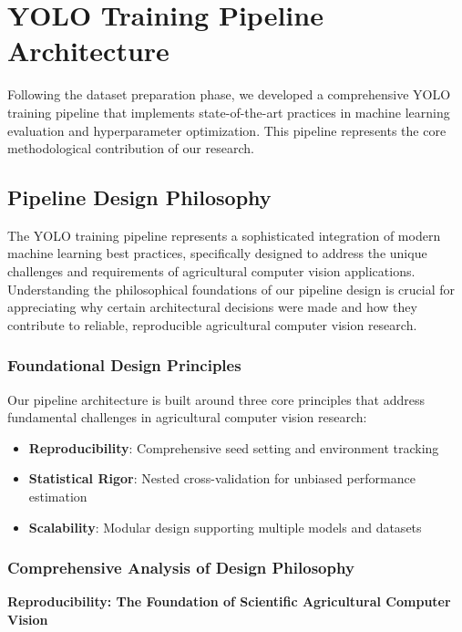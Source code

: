 \section{YOLO Training Pipeline Architecture}
Following the dataset preparation phase, we developed a comprehensive YOLO training pipeline that implements state-of-the-art practices in machine learning evaluation and hyperparameter optimization. This pipeline represents the core methodological contribution of our research.

\subsection{Pipeline Design Philosophy}

The YOLO training pipeline represents a sophisticated integration of modern machine learning best practices, specifically designed to address the unique challenges and requirements of agricultural computer vision applications. Understanding the philosophical foundations of our pipeline design is crucial for appreciating why certain architectural decisions were made and how they contribute to reliable, reproducible agricultural computer vision research.

\subsubsection{Foundational Design Principles}

Our pipeline architecture is built around three core principles that address fundamental challenges in agricultural computer vision research:

\begin{itemize}
    \item \textbf{Reproducibility}: Comprehensive seed setting and environment tracking
    \item \textbf{Statistical Rigor}: Nested cross-validation for unbiased performance estimation
    \item \textbf{Scalability}: Modular design supporting multiple models and datasets
\end{itemize}

\subsubsection{Comprehensive Analysis of Design Philosophy}

\textbf{Reproducibility: The Foundation of Scientific Agricultural Computer Vision}

